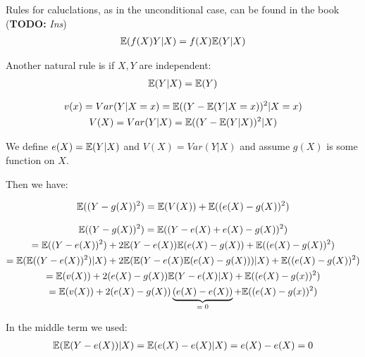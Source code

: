 \par\bigskip
\noindent Rules for caluclations, as in the unconditional case, can be found in the book (\textbf{TODO:}\textit{ Ins}) 
\begin{equation*}
  \begin{gathered}
    \mathbb{E}(f(X)Y|X) = f(X)\mathbb{E}(Y|X)
  \end{gathered}
\end{equation*}\par
\noindent Another natural rule is if $X,Y$ are independent:
\begin{equation*}
  \begin{gathered}
    \mathbb{E}(Y|X) =\mathbb{E}(Y)
  \end{gathered}
\end{equation*}
\par\bigskip
\begin{theo}{}
  \begin{equation*}
    \begin{gathered}
      v(x) = Var(Y|X = x) = \mathbb{E}((Y-\mathbb{E}(Y|X=x))^2|X=x)\\
      V(X) = Var(Y|X) = \mathbb{E}((Y-\mathbb{E}(Y|X))^2|X)
    \end{gathered}
  \end{equation*}
\end{theo}
\par\bigskip
\begin{theo}[]{}
  We define $e(X) = \mathbb{E}(Y|X)$ and $V(X) = Var(Y|X)$ and assume $g(X)$ is some function on $X$.\par
  \noindent Then we have:\par
  \begin{equation*}
    \begin{gathered}
      \mathbb{E}((Y-g(X))^2) = \mathbb{E}(V(X)) + \mathbb{E}((e(X)-g(X))^2)
    \end{gathered}
  \end{equation*}
\end{theo}
\pagebreak
\begin{prf}[]{}
  \begin{equation*}
    \begin{gathered}
      \mathbb{E}((Y-g(X))^2) = \mathbb{E}((Y-e(X)+e(X)-g(X))^2)\\
      = \mathbb{E}((Y-e(X))^2) +2 \mathbb{E}(Y-e(X))\mathbb{E}(e(X)-g(X)) +\mathbb{E}((e(X)-g(X))^2)\\
      = \mathbb{E}(\mathbb{E}((Y-e(X))^2)|X)+ 2\mathbb{E}(\mathbb{E}(Y-e(X)\mathbb{E}(e(X)-g(X)))|X)+ \mathbb{E}((e(X)-g(X))^2)\\
      =\mathbb{E}(v(X))+2(e(X)-g(X))\mathbb{E}(Y-e(X)|X)+\mathbb{E}((e(X)-g(x))^2)\\
      = \mathbb{E}(v(X))+2(e(X)-g(X))\underbrace{(e(X)-e(X))}_{\text{$=0$}}+\mathbb{E}((e(X)-g(x))^2)
    \end{gathered}
  \end{equation*}
  \par\bigskip
  \noindent In the middle term we used: 
  \begin{equation*}
    \begin{gathered}
      \mathbb{E}(\mathbb{E}(Y-e(X))|X) = \mathbb{E}(e(X)-e(X)|X) = e(X)-e(X)=0
    \end{gathered}
  \end{equation*}
\end{prf}
